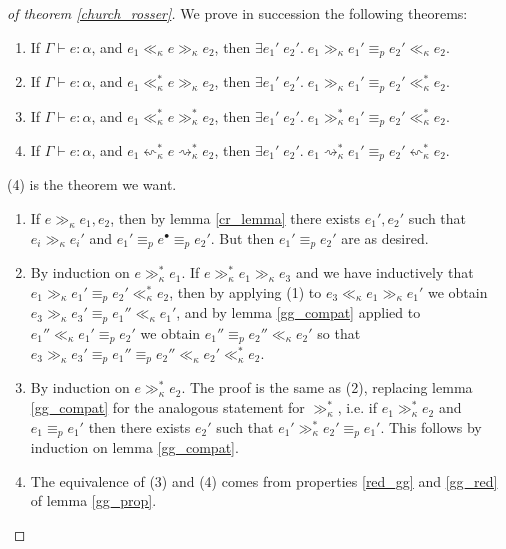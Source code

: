 \begin{proof}[of theorem \ref{church_rosser}]
We prove in succession the following theorems:
\begin{enumerate}
\item If $\Gamma\vdash e:\alpha$, and $e_1\ll_\kappa e\gg_\kappa e_2$, then $\exists e_1'\;e_2'.\; e_1\gg_\kappa e_1'\equiv_p e_2'\ll_\kappa e_2$.
\item If $\Gamma\vdash e:\alpha$, and $e_1\ll_\kappa^* e\gg_\kappa e_2$, then $\exists e_1'\;e_2'.\; e_1\gg_\kappa e_1'\equiv_p e_2'\ll_\kappa^* e_2$.
\item If $\Gamma\vdash e:\alpha$, and $e_1\ll_\kappa^* e\gg_\kappa^* e_2$, then $\exists e_1'\;e_2'.\; e_1\gg_\kappa^* e_1'\equiv_p e_2'\ll_\kappa^* e_2$.
\item If $\Gamma\vdash e:\alpha$, and $e_1\leftsquigarrow_\kappa^*e\rightsquigarrow_\kappa^* e_2$, then $\exists e_1'\;e_2'.\; e_1\rightsquigarrow_\kappa^* e_1'\equiv_p e_2'\leftsquigarrow_\kappa^* e_2$.
\end{enumerate}
(4) is the theorem we want.
\begin{enumerate}
\item If $e\gg_\kappa e_1,e_2$, then by lemma \ref{cr_lemma} there exists $e_1',e_2'$ such that $e_i\gg_\kappa e_i'$ and $e_1'\equiv_p e^\bullet\equiv_p e_2'$. But then $e_1'\equiv_p e_2'$ are as desired. 
\item By induction on $e\gg_\kappa^* e_1$. If $e\gg_\kappa^* e_1\gg_\kappa e_3$ and we have inductively that $e_1\gg_\kappa e_1'\equiv_p e_2'\ll_\kappa^* e_2$, then by applying (1) to $e_3\ll_\kappa e_1\gg_\kappa e_1'$ we obtain $e_3\gg_\kappa e_3'\equiv_p e_1''\ll_\kappa e_1'$, and by lemma \ref{gg_compat} applied to $e_1''\ll_\kappa e_1'\equiv_p e_2'$ we obtain $e_1''\equiv_p e_2''\ll_\kappa e_2'$ so that  $e_3\gg_\kappa e_3'\equiv_p e_1''\equiv_p e_2''\ll_\kappa e_2'\ll_\kappa^* e_2$.
\item By induction on $e\gg_\kappa^* e_2$. The proof is the same as (2), replacing lemma \ref{gg_compat} for the analogous statement for $\gg_\kappa^*$, i.e. if $e_1\gg_\kappa^*e_2$ and $e_1\equiv_p e_1'$ then there exists $e_2'$ such that $e_1'\gg_\kappa^*e_2'\equiv_p e_1'$. This follows by induction on lemma \ref{gg_compat}.
\item  The equivalence of (3) and (4) comes from properties \ref{red_gg} and \ref{gg_red} of lemma \ref{gg_prop}.
\end{enumerate}
\end{proof}

